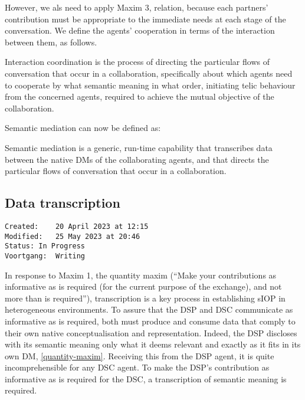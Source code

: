 \documentclass[sort&compress,preprint,3p,authoryear,twocolumn]{elsarticle}
\theoremstyle{break}			%
\begin{document}
However, we als need to apply Maxim 3, relation, because each partners'
contribution must be appropriate to the immediate needs at each stage of
the conversation. We define the agents' cooperation in terms of the
interaction between them, as follows.

\begin{mmdef}\label{def:ic}
Interaction coordination is the process of directing the particular flows of conversation that occur in a collaboration, specifically about which agents need to cooperate by what semantic meaning in what order, initiating telic behaviour from the concerned agents, required to achieve the mutual objective of the collaboration.
\end{mmdef}

Semantic mediation can now be defined as:

\begin{mmdef}\label{def:sm}
Semantic mediation is a generic, run-time capability that transcribes data between the native DMs of the collaborating agents, and that directs the particular flows of conversation that occur in a collaboration.
\end{mmdef}

\subsection{Data transcription}\label{data-transcription}

\begin{verbatim}
Created:    20 April 2023 at 12:15
Modified:   25 May 2023 at 20:46
Status: In Progress
Voortgang:  Writing
\end{verbatim}

In response to Maxim 1, the quantity maxim (``Make your contributions as
informative as is required (for the current purpose of the exchange),
and not more than is required''), transcription is a key process in
establishing sIOP in heterogeneous environments. To assure that the DSP
and DSC communicate as informative as is required, both must produce and
consume data that comply to their own native conceptualisation and
representation. Indeed, the DSP discloses with its semantic meaning only
what it deems relevant and exactly as it fits in its own DM,
\cref{quantity-maxim}. Receiving this from the DSP agent, it is quite
incomprehensible for any DSC agent. To make the DSP's contribution as
informative as is required for the DSC, a transcription of semantic
meaning is required.
\end{document}
